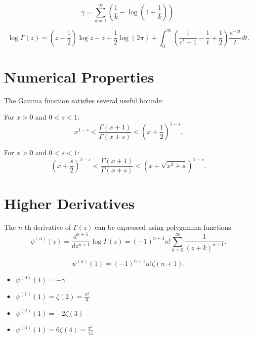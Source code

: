 \begin{theorem}
\[
\gamma = \sum_{k=1}^\infty \left(\frac{1}{k} - \log\left(1 + \frac{1}{k}\right)\right).
\]
\end{theorem}

\begin{theorem}
\[
\log\Gamma(z) = \left(z - \frac{1}{2}\right)\log z - z + \frac{1}{2}\log(2\pi) + \int_0^\infty \left(\frac{1}{e^t - 1} - \frac{1}{t} + \frac{1}{2}\right)\frac{e^{-zt}}{t} dt.
\]
\end{theorem}

\section{Numerical Properties}

The Gamma function satisfies several useful bounds:

\begin{theorem}
For $x > 0$ and $0 < s < 1$:
\[
x^{1-s} < \frac{\Gamma(x+1)}{\Gamma(x+s)} < \left(x + \frac{1}{2}\right)^{1-s}.
\]
\end{theorem}

\begin{theorem}
For $x > 0$ and $0 < s < 1$:
\[
\left(x + \frac{s}{2}\right)^{1-s} < \frac{\Gamma(x+1)}{\Gamma(x+s)} < \left(x + \sqrt{x^2 + s}\right)^{1-s}.
\]
\end{theorem}

\section{Higher Derivatives}

\begin{theorem}
The $n$-th derivative of $\Gamma(z)$ can be expressed using polygamma functions:
\[
\psi^{(n)}(z) = \frac{d^{n+1}}{dz^{n+1}} \log\Gamma(z) = (-1)^{n+1} n! \sum_{k=0}^\infty \frac{1}{(z+k)^{n+1}}.
\]
\end{theorem}

\begin{corollary}
\[
\psi^{(n)}(1) = (-1)^{n+1} n! \zeta(n+1).
\]
\end{corollary}

\begin{itemize}
    \item $\psi^{(0)}(1) = -\gamma$
    \item $\psi^{(1)}(1) = \zeta(2) = \frac{\pi^2}{6}$
    \item $\psi^{(2)}(1) = -2\zeta(3)$
    \item $\psi^{(3)}(1) = 6\zeta(4) = \frac{\pi^4}{15}$
\end{itemize}


